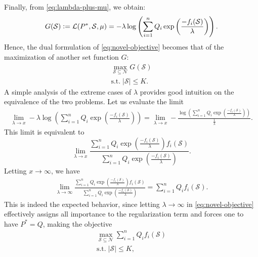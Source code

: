 \documentclass[letter,11pt]{article}
\def\lp{\left(}
\def\rp{\right)}
\def\sS{\mathcal{S}}
\def\sN{\mathcal{N}}
\begin{document}
Finally, from \eqref{eq:lambda-plus-mu}, we obtain:
\begin{equation}
\begin{split}
G(\sS) \vcentcolon= \mathcal{L}(P^*, \sS, \mu)= -\lambda\log\lp\sum_{i=1}^nQ_i\exp{\lp\frac{-f_i(\sS)}{\lambda}\rp}\rp.
\end{split}
\end{equation}
Hence, the dual formulation of \eqref{eq:novel-objective} becomes that of the maximization of another set function $G$:
\begin{equation}\label{eq:novel-clean}
\begin{gathered}
\max_{\sS \subseteq \sN} G(\sS) \\%
\text{s.t.}\;\lvert \sS\rvert \leq K.
\end{gathered}
\end{equation}
A simple analysis of the extreme cases of  $\lambda$ provides good intuition on the equivalence of the two problems. Let us evaluate the limit
\begin{equation}
\begin{split}
\lim_{\lambda\to x} -\lambda\log\lp\sum_{i=1}^nQ_i\exp{\lp\frac{-f_i(\sS)}{\lambda}\rp}\rp = \lim_{\lambda\to x} - \frac{\log\lp\sum_{i=1}^nQ_i\exp{\lp\frac{-f_i(\sS)}{\lambda}\rp}\rp}{\frac{1}{\lambda}}.
\end{split}
\end{equation}
This limit is equivalent to
\begin{equation}
\lim_{\lambda\to x} \frac{\sum_{i=1}^nQ_i\exp{\lp\frac{-f_i(\sS)}{\lambda}\rp f_i(\sS)}}{\sum_{i=1}^nQ_i\exp{\lp\frac{-f_i(\sS)}{\lambda}\rp}}.
\end{equation}
Letting $x\to \infty$, we have
\begin{equation}\label{eq:recovered-1}
\begin{split}
\lim_{\lambda\to \infty} \frac{\sum_{i=1}^nQ_i\exp{\lp\frac{-f_i(\sS)}{\lambda}\rp f_i(\sS)}}{\sum_{i=1}^nQ_i\exp{\lp\frac{-f_i(\sS)}{\lambda}\rp}} = \sum_{i=1}^nQ_i f_i(\sS).
\end{split}
\end{equation}
This is indeed the expected behavior, since letting $\lambda\to \infty$ in \eqref{eq:novel-objective} effectively assigns all importance to the regularization term and forces one to have $P^\ast = Q$, making the objective
\begin{equation}
\begin{gathered}
\max_{\sS\subseteq \sN} \sum_{i=1}^nQ_i f_i(\sS)\\
\text{s.t.}\;\lvert \sS\rvert \leq K,
\end{gathered}
\end{equation}
\end{document}

